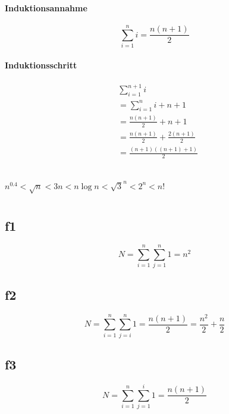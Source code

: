 \documentclass{article}
\begin{document}
    \paragraph{Induktionsannahme}
    \begin{equation*}
        \sum_{i=1}^n i = \frac{n(n+1)}{2}
    \end{equation*}
    \paragraph{Induktionsschritt}
    \begin{align*}
        &\sum_{i=1}^{n+1} i\\
        &=\sum_{i=1}^{n} i + n + 1\\
        &=\frac{n(n+1)}{2} + n + 1\\
        &=\frac{n(n+1)}{2} + \frac{2(n+1)}{2}\\
        &=\frac{(n+1)((n+1)+1)}{2}\\
    \end{align*}

    \subsection{}
    $n^{0.4}<\sqrt{n}<3n<n\log n<\sqrt{3}^n<2^n<n!$

    \section{}
    \subsection{f1}
    \begin{equation*}
        N=\sum_{i=1}^n\sum_{j=1}^n 1 = n^2
    \end{equation*}

    \subsection{f2}
    \begin{equation*}
        N=\sum_{i=1}^n\sum_{j=i}^n 1 = \frac{n(n+1)}{2} = \frac{n^2}{2}+\frac{n}{2}
    \end{equation*}

    \subsection{f3}
    \begin{equation*}
        N=\sum_{i=1}^n\sum_{j=1}^i 1 = \frac{n(n+1)}{2}
    \end{equation*}
\end{document}
